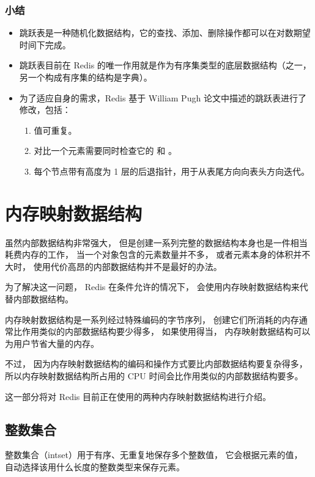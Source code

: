 \documentclass[a4paper,11pt,english]{sphinxmanual}
\begin{document}
\subsection{小结}
\label{internal-datastruct/skiplist:id5}\begin{itemize}
\item {} 
跳跃表是一种随机化数据结构，它的查找、添加、删除操作都可以在对数期望时间下完成。

\item {} 
跳跃表目前在 Redis 的唯一作用就是作为有序集类型的底层数据结构（之一，另一个构成有序集的结构是字典）。

\item {} 
为了适应自身的需求，Redis 基于 William Pugh 论文中描述的跳跃表进行了修改，包括：
\begin{enumerate}
\item {} 
 值可重复。

\item {} 
对比一个元素需要同时检查它的  和  。

\item {} 
每个节点带有高度为 1 层的后退指针，用于从表尾方向向表头方向迭代。

\end{enumerate}

\end{itemize}


\chapter{内存映射数据结构}
\label{index:id2}
虽然内部数据结构非常强大，
但是创建一系列完整的数据结构本身也是一件相当耗费内存的工作，
当一个对象包含的元素数量并不多，
或者元素本身的体积并不大时，
使用代价高昂的内部数据结构并不是最好的办法。

为了解决这一问题，
Redis 在条件允许的情况下，
会使用内存映射数据结构来代替内部数据结构。

内存映射数据结构是一系列经过特殊编码的字节序列，
创建它们所消耗的内存通常比作用类似的内部数据结构要少得多，
如果使用得当，
内存映射数据结构可以为用户节省大量的内存。

不过，
因为内存映射数据结构的编码和操作方式要比内部数据结构要复杂得多，
所以内存映射数据结构所占用的 CPU 时间会比作用类似的内部数据结构要多。

这一部分将对 Redis 目前正在使用的两种内存映射数据结构进行介绍。


\section{整数集合}
\label{compress-datastruct/intset::doc}\label{compress-datastruct/intset:id1}
整数集合（intset）用于有序、无重复地保存多个整数值，
它会根据元素的值，
自动选择该用什么长度的整数类型来保存元素。
\end{document}
